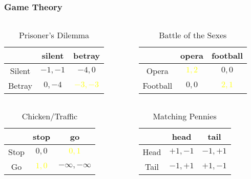 \documentclass[UTF8,aspectratio=43,11pt,colorlinks,compress,openany]{beamer}%
\begin{document}
\begin{frame}\frametitle{Game Theory}
\begin{columns}
\begin{table}
\begin{tabu}{c|cc}
\hline
 & silent & betray\\
\hline
Silent & $-1,-1$ & $-4,0$\\
Betray & $0,-4$ &\textcolor{yellow}{$-3,-3$}\\
\hline
\end{tabu}\caption{Prisoner's Dilemma}
\end{table}
\begin{table}
\begin{tabu}{c|cc}
\hline
 & opera & football\\
\hline
Opera & \textcolor{yellow}{$1,2$} & $0,0$\\
Football & $0,0$ & \textcolor{yellow}{$2,1$}\\
\hline
\end{tabu}\caption{Battle of the Sexes}
\end{table}
\end{columns}
\begin{columns}
\begin{table}
\begin{tabu}{c|cc}
\hline
 & stop & go\\
\hline
Stop & $0,0$ & \textcolor{yellow}{$0,1$}\\
Go & \textcolor{yellow}{$1,0$} & $-\infty,-\infty$\\
\hline
\end{tabu}
\caption{\footnotesize Chicken/Traffic}
\end{table}
\begin{table}
\begin{tabu}{c|cc}
\hline
 & head & tail\\
\hline
Head & $+1,-1$ & $-1,+1$\\
Tail & $-1,+1$ & $+1,-1$\\
\hline
\end{tabu}\caption{Matching Pennies}
\end{table}
\end{columns}
\end{frame}
\end{document}
